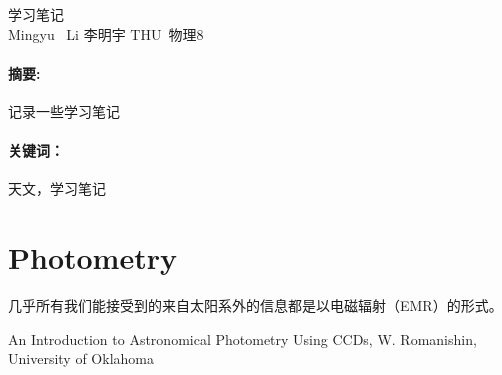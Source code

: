 \documentclass[CJK, utf8, GBK, oneside, a4paper, 12pt]{ctexart}
\newcommand{\myfiguresetwidthfilecaplabel}[4]{
    \centering
    \texttt{[image: ./images/\#2]}
    \captionsetup{font={footnotesize}}
    \caption{#3}
    \label{#4} }
\renewenvironment*{abstract}[1]{%
\newcommand\gjc{#1}
\paragraph{摘要:}
}{\paragraph{关键词：}\gjc }
\newcommand{\rd}{\mathrm{d}}
\newcommand{\dps}[1]{\displaystyle{#1}}
\begin{document}



\renewcommand\appendix{\setcounter{secnumdepth}{-2}}



\begin{center}
    \heiti{}学习笔记\\
    \kaishu{}Mingyu \ Li \qquad 李明宇 \qquad THU\  物理8
\end{center}

\begin{abstract}{天文，学习笔记}
    记录一些学习笔记
\end{abstract}
\tableofcontents
\newpage
\begin{comment}
\begin{equation}\dps{ v_g=\frac{\rd \omega}{\rd k}=\frac{c}{n+\omega\frac{\rd n}{\rd \omega}}}\end{equation}

\begin{figure}[!htbp]
    \myfiguresetwidthfilecaplabel{0.92}{1}{周期性阻抗同轴电缆示意图}{F1}
\end{figure}

\end{comment}
\section{Photometry}

几乎所有我们能接受到的来自太阳系外的信息都是以电磁辐射（EMR）的形式。






\begin{thebibliography}{1}
 An Introduction to Astronomical Photometry Using CCDs, W. Romanishin, University of Oklahoma
\end{thebibliography}
\end{document}
